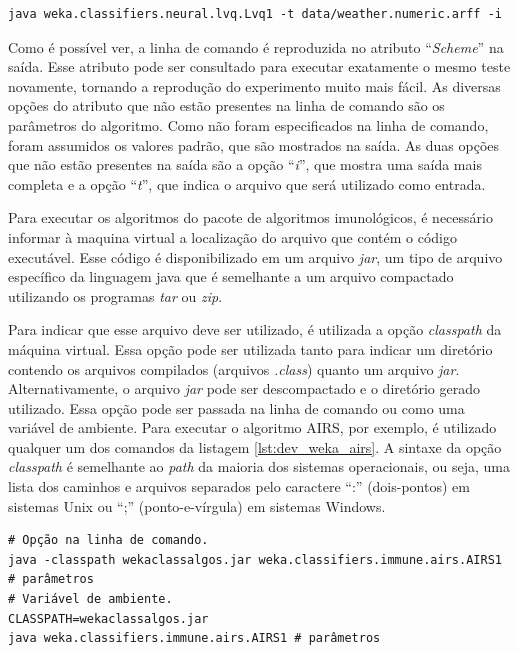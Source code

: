 \vspace{0.5cm}
\begin{lstlisting}[caption=Execução de um classificador, label=lst:dev_exec_classifier]
java weka.classifiers.neural.lvq.Lvq1 -t data/weather.numeric.arff -i
\end{lstlisting}
\vspace{0.5cm}

Como é possível ver, a linha de comando é reproduzida no atributo ``\emph{Scheme}'' na saída. Esse atributo pode ser consultado para executar exatamente o mesmo teste novamente, tornando a reprodução do experimento muito mais fácil. As diversas opções do atributo que não estão presentes na linha de comando são os parâmetros do algoritmo. Como não foram especificados na linha de comando, foram assumidos os valores padrão, que são mostrados na saída. As duas opções que não estão presentes na saída são a opção ``\emph{i}'', que mostra uma saída mais completa e a opção ``\emph{t}'', que indica o arquivo que será utilizado como entrada.

Para executar os algoritmos do pacote de algoritmos imunológicos, é necessário informar à maquina virtual a localização do arquivo que contém o código executável. Esse código é disponibilizado em um arquivo \emph{jar}, um tipo de arquivo específico da linguagem java que é semelhante a um arquivo compactado utilizando os programas \emph{tar} ou \emph{zip}.

Para indicar que esse arquivo deve ser utilizado, é utilizada a opção \emph{classpath} da máquina virtual. Essa opção pode ser utilizada tanto para indicar um diretório contendo os arquivos compilados (arquivos \emph{.class}) quanto um arquivo \emph{jar}. Alternativamente, o arquivo \emph{jar} pode ser descompactado e o diretório gerado utilizado. Essa opção pode ser passada na linha de comando ou como uma variável de ambiente. Para executar o algoritmo AIRS, por exemplo, é utilizado qualquer um dos comandos da listagem \ref{lst:dev_weka_airs}. A sintaxe da opção \emph{classpath} é semelhante ao \emph{path} da maioria dos sistemas operacionais, ou seja, uma lista dos caminhos e arquivos separados pelo caractere ``:'' (dois-pontos) em sistemas Unix ou ``;'' (ponto-e-vírgula) em sistemas Windows.

\vspace{0.5cm}
\begin{lstlisting}[caption=Execução de um algoritmo do pacote de algoritmos imunológicos, label=lst:dev_weka_airs]
# Opção na linha de comando.
java -classpath wekaclassalgos.jar weka.classifiers.immune.airs.AIRS1 # parâmetros
# Variável de ambiente.
CLASSPATH=wekaclassalgos.jar
java weka.classifiers.immune.airs.AIRS1 # parâmetros
\end{lstlisting}
\vspace{0.5cm}

